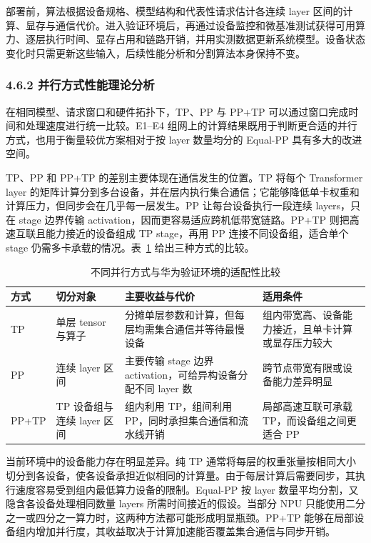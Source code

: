 部署前，算法根据设备规格、模型结构和代表性请求估计各连续 layer 区间的计算、显存与通信代价。进入验证环境后，再通过设备监控和微基准测试获得可用算力、逐层执行时间、显存占用和链路开销，并用实测数据更新系统模型。设备状态变化时只需更新这些输入，后续性能分析和分割算法本身保持不变。

\subsubsection*{4.6.2 并行方式性能理论分析}

在相同模型、请求窗口和硬件拓扑下，TP、PP 与 PP+TP 可以通过窗口完成时间和处理速度进行统一比较。E1--E4 组网上的计算结果既用于判断更合适的并行方式，也用于衡量较优方案相对于按 layer 数量均分的 Equal-PP 具有多大的改进空间。

TP、PP 和 PP+TP 的差别主要体现在通信发生的位置。TP 将每个 Transformer layer 的矩阵计算分到多台设备，并在层内执行集合通信；它能够降低单卡权重和计算压力，但同步会在几乎每一层发生。PP 让每台设备执行一段连续 layers，只在 stage 边界传输 activation，因而更容易适应跨机低带宽链路。PP+TP 则把高速互联且能力接近的设备组成 TP stage，再用 PP 连接不同设备组，适合单个 stage 仍需多卡承载的情况。表~\ref{tab:ch4-parallel-choice} 给出三种方式的比较。

\begin{table}[!htbp]
\centering
\small
\caption{不同并行方式与华为验证环境的适配性比较}
\label{tab:ch4-parallel-choice}
\begin{tabular}{p{}p{}p{}p{}}
\hline
方式 & 切分对象 & 主要收益与代价 & 适用条件 \\
\hline
TP & 单层 tensor 与算子 & 分摊单层参数和计算，但每层均需集合通信并等待最慢设备 & 组内带宽高、设备能力接近，且单卡计算或显存压力较大 \\
PP & 连续 layer 区间 & 主要传输 stage 边界 activation，可给异构设备分配不同 layer 数 & 跨节点带宽有限或设备能力差异明显 \\
PP+TP & TP 设备组与连续 layer 区间 & 组内利用 TP，组间利用 PP，同时承担集合通信和流水线开销 & 局部高速互联可承载 TP，而设备组之间更适合 PP \\
\hline
\end{tabular}
\end{table}

当前环境中的设备能力存在明显差异。纯 TP 通常将每层的权重张量按相同大小切分到各设备，使各设备承担近似相同的计算量。由于每层计算后需要同步，其执行速度容易受到组内最低算力设备的限制。Equal-PP 按 layer 数量平均分割，又隐含各设备处理相同数量 layers 所需时间接近的假设。当部分 NPU 只能使用二分之一或四分之一算力时，这两种方法都可能形成明显瓶颈。PP+TP 能够在局部设备组内增加并行度，其收益取决于计算加速能否覆盖集合通信与同步开销。

